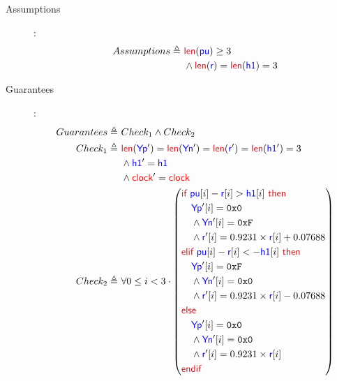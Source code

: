 \documentclass[fleqn,a4paper]{article}
\newcommand\Var[1]{\textcolor{blue}{\textsf{#1}}}
\newcommand\syntax[1]{\textcolor[RGB]{202,12,22}{\textsf{#1}}}
\newcommand\clock{\textcolor{red}{\textsf{clock}}}
\newcommand\definedby{\triangleq}
\begin{document}
\begin{description}
\item[Assumptions]:
\begin{align*}
Assumptions \definedby \
& \syntax{len}(\Var{pu}) \geq 3 \\
& \wedge \syntax{len}(\Var{r}) = \syntax{len}(\Var{h1}) = 3
\end{align*}
\item[Guarantees]:
\begin{align*}
Guarantees \definedby \
& Check_1 \wedge Check_2 \\
Check_1 \definedby \
& \syntax{len}(\Var{Yp}') = \syntax{len}(\Var{Yn}') = \syntax{len}(\Var{r}') = \syntax{len}(\Var{h1}') = 3 \\
& \wedge \Var{h1}'=\Var{h1} \\
& \wedge \clock'=\clock \\
Check_2 \definedby \
& \forall 0 \leq i < 3 \cdot 
\left(
\begin{aligned}
& \syntax{if } \Var{pu}[i] - \Var{r}[i] > \Var{h1}[i] \syntax{ then} \\
& \quad \Var{Yp}'[i] = \texttt{0x0} \\
& \quad\wedge \Var{Yn}'[i] = \texttt{0xF} \\
& \quad\wedge \Var{r}'[i] = 0.9231 \times \Var{r}[i] + 0.07688 \\
& \syntax{elif } \Var{pu}[i] - \Var{r}[i] < - \Var{h1}[i] \syntax{ then} \\
& \quad \Var{Yp}'[i] = \texttt{0xF} \\
& \quad \wedge \Var{Yn}'[i] = \texttt{0x0} \\
& \quad \wedge \Var{r}'[i] = 0.9231 \times \Var{r}[i] - 0.07688 \\
& \syntax{else} \\
& \quad \Var{Yp}'[i] = \texttt{0x0} \\
& \quad \wedge \Var{Yn}'[i] = \texttt{0x0} \\
& \quad \wedge \Var{r}'[i] = 0.9231 \times \Var{r}[i] \\
& \syntax{endif}
\end{aligned}
\right)
\end{align*}
\end{description}
\end{document}
